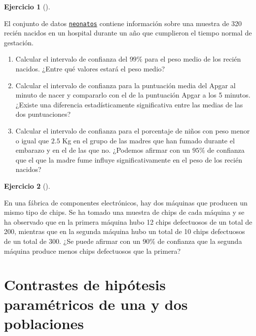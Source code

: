 \documentclass[
  a4paper,
]{scrreport}
\theoremstyle{definition}
\newtheorem{exercise}{Ejercicio}[chapter]
\theoremstyle{remark}
\begin{document}
\begin{exercise}[]\protect\hypertarget{exr-intervalos-confianza-1-poblacion-neonatos}{}\label{exr-intervalos-confianza-1-poblacion-neonatos}

El conjunto de datos
\href{https://aprendeconalf.es/estadistica-practicas-r/datos/neonatos.csv}{\texttt{neonatos}}
contiene información sobre una muestra de 320 recién nacidos en un
hospital durante un año que cumplieron el tiempo normal de gestación.

\begin{enumerate}
\def\labelenumi{\alph{enumi}.}
\item
  Calcular el intervalo de confianza del \(99\%\) para el peso medio de
  los recién nacidos. ¿Entre qué valores estará el peso medio?
\item
  Calcular el intervalo de confianza para la puntuación media del Apgar
  al minuto de nacer y compararlo con el de la puntuación Apgar a los 5
  minutos. ¿Existe una diferencia estadísticamente significativa entre
  las medias de las dos puntuaciones?
\item
  Calcular el intervalo de confianza para el porcentaje de niños con
  peso menor o igual que \(2.5\) Kg en el grupo de las madres que han
  fumado durante el embarazo y en el de las que no. ¿Podemos afirmar con
  un \(95\%\) de confianza que el que la madre fume influye
  significativamente en el peso de los recién nacidos?
\end{enumerate}

\end{exercise}

\begin{exercise}[]\protect\hypertarget{exr-intervalos-confianza-1-poblacion-piezas-defectuosas}{}\label{exr-intervalos-confianza-1-poblacion-piezas-defectuosas}

En una fábrica de componentes electrónicos, hay dos máquinas que
producen un mismo tipo de chips. Se ha tomado una muestra de chips de
cada máquina y se ha observado que en la primera máquina hubo 12 chips
defectuosos de un total de 200, mientras que en la segunda máquina hubo
un total de 10 chips defectuosos de un total de 300. ¿Se puede afirmar
con un \(90\%\) de confianza que la segunda máquina produce menos chips
defectuosos que la primera?

\end{exercise}


\chapter{Contrastes de hipótesis paramétricos de una y dos
poblaciones}\label{contrastes-de-hipuxf3tesis-paramuxe9tricos-de-una-y-dos-poblaciones}
\end{document}
